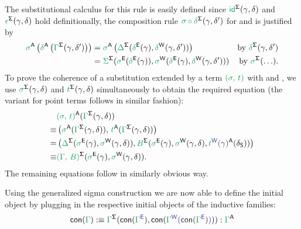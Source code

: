 \begin{defn}
The substitutional calculus for this rule is easily defined since
$\grm{\id}^\Sg(\gamma, \delta)$ and $\grm{\epsilon}^\Sg(\gamma, \delta)$ hold
definitionally,
the composition rule $\grm{\sigma \circ \delta}^\Sg(\gamma, \delta')$
for \grm{\IISub{\sigma}{\Delta}{\Sigma}} and
\grm{\IISub{\delta}{\Gamma}{\Delta}} is justified
by
\begin{align*}
\grm{\sigma}^\CC\left(\grm{\delta}^\CC\left(\grm{\Gamma}^\Sg(\gamma, \delta')\right)\right)
  &= \grm{\sigma}^\CC\left(\grm{\Delta}^\Sg(\grm{\delta}^\EE(\gamma), \grm{\delta}^\WW(\gamma, \delta') ) \right)
  & \text{by $\grm{\delta}^\Sg(\gamma, \delta') $} \\
  & = \grm{\Sigma}^\Sg(\grm{\sigma}^\EE(\grm{\delta}^\EE(\gamma)),
     \grm{\sigma}^\WW(\grm{\delta}^\EE(\gamma),\grm{\delta}^\WW(\gamma, \delta') ) )
  & \text{by $\grm{\sigma}^\Sg(\ldots) $.}
\end{align*}
To prove the coherence of a substitution extended by a term
$\grm{(\sigma,\,t)}$ with \grm{\IISub{\sigma}{\Gamma}{\Delta}} and
, we use
$\grm{\sigma}^\Sg(\gamma, \delta)$ and $\grm{t}^\Sg(\gamma, \delta)$
simultaneously to obtain the required equation (the variant for point terms follows
in similar fashion):
\begin{align*}
  & \grm{(\sigma,\,t)}^\CC(\grm{\Gamma}^\Sg(\gamma, \delta)) \\
  \equiv &\left( \grm{\sigma}^\CC(\grm{\Gamma}^\Sg(\gamma, \delta)) ,\,
    \grm{t}^\CC(\grm{\Gamma}^\Sg(\gamma, \delta))   \right) \\
  = &\left( \grm{\Delta}^\Sg(\grm{\sigma}^\EE(\gamma), \grm{\sigma}^\WW(\gamma, \delta) ) ,
    \grm{B}^\Sg(\grm{\sigma}^\EE(\gamma), \grm{\sigma}^\WW(\gamma, \delta),
      \tqm{\grm{t}^\WW(\blgamma)}^\CC(\delta_\Sc))\right) \\
  \equiv & \grm{(\Gamma,\,B)}^\Sg(\grm{\sigma}^\EE(\gamma), \grm{\sigma}^\WW(\gamma, \delta)) \text{.}
\end{align*}
The remaining equations follow in similarly obvious way.


\end{defn}

\begin{defn}
Using the generalized sigma construction we are now able to define the initial
object by plugging in the respective initial objects of the inductive families:
\begin{equation*}
\con{\Gamma} :\equiv \grm{\Gamma}^\Sg(\IFcon{\grm{\Gamma}^\EE}, \IFcon{\grm{\Gamma}^\WW(\blm{\IFcon{\grm{\Gamma}^\EE}})})
  : \grm{\Gamma}^\CC
\end{equation*}
\end{defn}

